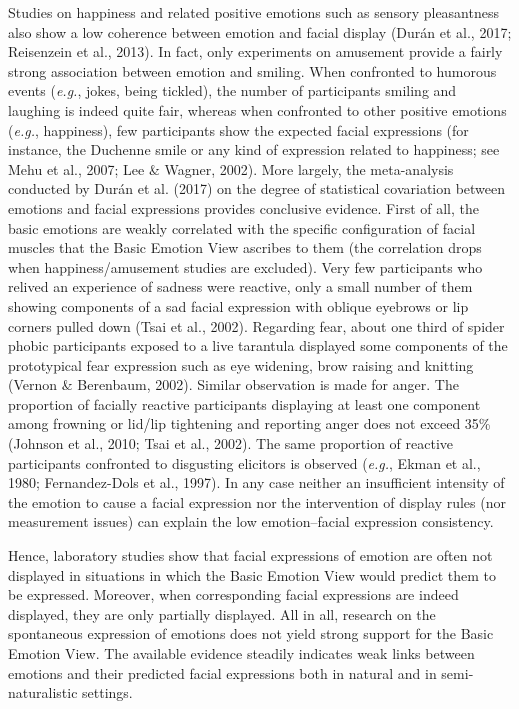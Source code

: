 \documentclass[
  english,
  man]{apa7}
\begin{document}
Studies on happiness and related positive emotions such as sensory pleasantness also show a low coherence between emotion and facial display (Durán et al., 2017; Reisenzein et al., 2013). In fact, only experiments on amusement provide a fairly strong association between emotion and smiling. When confronted to humorous events (\emph{e.g.}, jokes, being tickled), the number of participants smiling and laughing is indeed quite fair, whereas when confronted to other positive emotions (\emph{e.g.}, happiness), few participants show the expected facial expressions (for instance, the Duchenne smile or any kind of expression related to happiness; see Mehu et al., 2007; Lee \& Wagner, 2002). More largely, the meta-analysis conducted by Durán et al. (2017) on the degree of statistical covariation between emotions and facial expressions provides conclusive evidence. First of all, the basic emotions are weakly correlated with the specific configuration of facial muscles that the Basic Emotion View ascribes to them (the correlation drops when happiness/amusement studies are excluded). Very few participants who relived an experience of sadness were reactive, only a small number of them showing components of a sad facial expression with oblique eyebrows or lip corners pulled down (Tsai et al., 2002). Regarding fear, about one third of spider phobic participants exposed to a live tarantula displayed some components of the prototypical fear expression such as eye widening, brow raising and knitting (Vernon \& Berenbaum, 2002). Similar observation is made for anger. The proportion of facially reactive participants displaying at least one component among frowning or lid/lip tightening and reporting anger does not exceed 35\% (Johnson et al., 2010; Tsai et al., 2002). The same proportion of reactive participants confronted to disgusting elicitors is observed (\emph{e.g.}, Ekman et al., 1980; Fernandez-Dols et al., 1997). In any case neither an insufficient intensity of the emotion to cause a facial expression nor the intervention of display rules (nor measurement issues) can explain the low emotion--facial expression consistency.

Hence, laboratory studies show that facial expressions of emotion are often not displayed in situations in which the Basic Emotion View would predict them to be expressed. Moreover, when corresponding facial expressions are indeed displayed, they are only partially displayed. All in all, research on the spontaneous expression of emotions does not yield strong support for the Basic Emotion View. The available evidence steadily indicates weak links between emotions and their predicted facial expressions both in natural and in semi-naturalistic settings.
\end{document}
